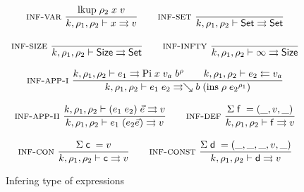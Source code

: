 \begin{figure}[p]
\begin{gather*}
	  \mbox{\sc inf-var}\ \dfrac{\mathrm{lkup} \; \rho_2 \; x \; v}{k,\rho_1,\rho_2\vdash x\rightrightarrows v}
\qquad	  \mbox{\sc inf-set}\ \dfrac{}{k,\rho_1,\rho_2\vdash\mathsf{Set}\rightrightarrows\mathsf{Set}}   
\\[2ex]
	  \mbox{\sc inf-size}\ \dfrac{}{k,\rho_1,\rho_2\vdash\mathsf{Size}\rightrightarrows\mathsf{Set}}
\qquad
	  \mbox{\sc inf-infty}\ \dfrac{}{k,\rho_1,\rho_2\vdash\infty\rightrightarrows\mathsf{Size}} 
\\[2ex]
\mbox{\sc inf-app-i}\ \dfrac{k,\rho_1,\rho_2\vdash e_1\rightrightarrows\mathrm{Pi} \; x \; v_a \; b^{\rho}
\qquad k,\rho_1,\rho_2\vdash e_2\leftleftarrows v_a}{k,\rho_1,\rho_2\vdash e_1 \; e_2\rightrightarrows\searrow b \; (\mathrm{ins} \; \rho \; {e_2}^{\rho_1})}
\\[2ex]
\mbox{\sc inf-app-ii}\ \dfrac{k,\rho_1,\rho_2\vdash(e_1 \; e_2)\;\vec{e}\rightrightarrows v}{k,\rho_1,\rho_2\vdash e_1 \; (e_2 \vec{e})\rightrightarrows v}
\qquad
\mbox{\sc inf-def}\ \dfrac{\mathrm{\Sigma} \; \mathsf{f} \; = (\_,v,\_) }{k,\rho_1,\rho_2\vdash\mathsf{f}\rightrightarrows v}
\\[2ex]
\mbox{\sc inf-con}\ \dfrac{\mathrm{\Sigma} \; \mathsf{c} \; = v}{k,\rho_1,\rho_2\vdash\mathsf{c}\rightrightarrows v} 
\qquad
\mbox{\sc inf-const}\ \dfrac{\mathrm{\Sigma} \; \mathsf{d} \; = (\_,\_,\_,v,\_)}{k,\rho_1,\rho_2\vdash\mathsf{d}\rightrightarrows v}
\end{gather*}

\caption{Infering type of expressions}
\end{figure}

